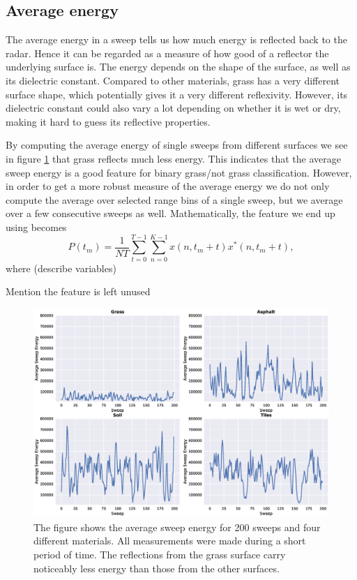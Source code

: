 \subsection{Average energy}
The average energy in a sweep tells us how much energy is reflected back to the radar. Hence it can be regarded as a measure of how good of a reflector the underlying surface is. The energy depends on the shape of the surface, as well as its dielectric constant. Compared to other materials, grass has a very different surface shape, which potentially gives it a very different reflexivity. However, its dielectric constant could also vary a lot depending on whether it is wet or dry, making it hard to guess its reflective properties.

By computing the average energy of single sweeps from different surfaces we see in figure \ref{fig:sweep_energy} that grass reflects much less energy. This indicates that the average sweep energy is a good feature for binary grass/not grass classification. However, in order to get a more robust measure of the average energy we do not only compute the average over selected range bins of a single sweep, but we average over a few consecutive sweeps as well. Mathematically, the feature we end up using becomes
\begin{equation}
	P(t_m) = \frac{1}{NT}\sum_{t=0}^{T-1}\sum_{n=0}^{K-1}x(n, t_m + t)x^*(n, t_m + t),
\end{equation}
where (describe variables)

Mention the feature is left unused

\begin{figure}[h]
	\centering
	\includegraphics[scale=0.45]{figs_temp/features/sweep_energy}
	\caption{The figure shows the average sweep energy for 200 sweeps and four different materials. All measurements were made during a short period of time. The reflections from the grass surface carry noticeably less energy than those from the other surfaces. }
	\label{fig:sweep_energy}
\end{figure}



